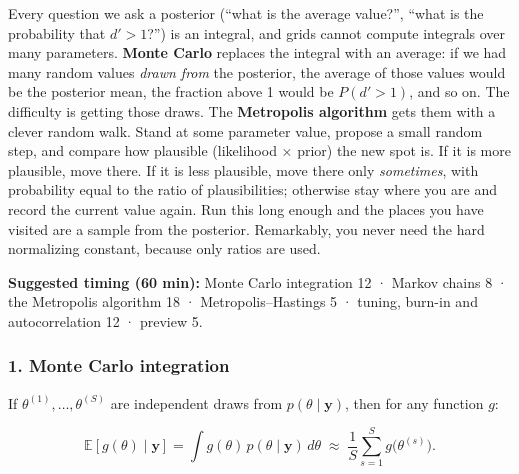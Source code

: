 Every question we ask a posterior (``what is the average value?'',
``what is the probability that \(d' > 1\)?'') is an integral, and grids
cannot compute integrals over many parameters. \textbf{Monte Carlo}
replaces the integral with an average: if we had many random values
\emph{drawn from} the posterior, the average of those values would be
the posterior mean, the fraction above 1 would be \(P(d' > 1)\), and so
on. The difficulty is getting those draws. The \textbf{Metropolis
algorithm} gets them with a clever random walk. Stand at some parameter
value, propose a small random step, and compare how plausible
(likelihood × prior) the new spot is. If it is more plausible, move
there. If it is less plausible, move there only \emph{sometimes}, with
probability equal to the ratio of plausibilities; otherwise stay where
you are and record the current value again. Run this long enough and the
places you have visited are a sample from the posterior. Remarkably, you
never need the hard normalizing constant, because only ratios are used.

\textbf{Suggested timing (60 min):} Monte Carlo integration 12 · Markov
chains 8 · the Metropolis algorithm 18 · Metropolis--Hastings 5 ·
tuning, burn-in and autocorrelation 12 · preview 5.

\subsubsection{1. Monte Carlo integration}

If \(\theta^{(1)}, \dots, \theta^{(S)}\) are independent draws from
\(p(\theta\mid\mathbf{y})\), then for any function \(g\):

\[
\mathbb{E}[g(\theta)\mid\mathbf{y}] = \int g(\theta)\, p(\theta\mid\mathbf{y})\, d\theta \;\approx\; \frac{1}{S}\sum_{s=1}^{S} g\big(\theta^{(s)}\big).
\]

